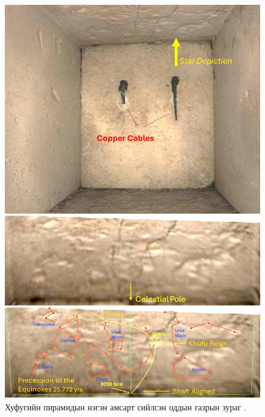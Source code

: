 \documentclass[10pt,twocolumn,letterpaper]{article}
\begin{document}
\begin{figure}[H]
\begin{center}
   \includegraphics[width=1\linewidth]{star-stone.jpg}
\end{center}
   \caption{Хуфугийн пирамидын нэгэн амсарт сийлсэн оддын газрын зураг \cite{28}.}
\label{fig:20}
\label{fig:onecol}
\end{figure}
\end{document}
